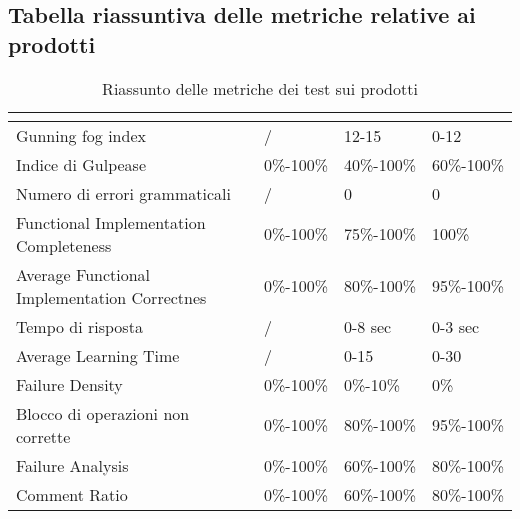 \subsection{Tabella riassuntiva delle metriche relative ai prodotti}
\renewcommand{\arraystretch}{1.5}
\begin{table}[H]
	\centering
	\begin{tabular}{|C{4cm}|C{3cm}|C{3cm}|C{3cm}|}
		\hline
		\textbf{\color{title_text}{Nome Metrica}} & \textbf{\color{title_text}{Intervallo limite}} & \textbf{\color{title_text}{Range accettabile}} & \textbf{\color{title_text}{Range ottimale}} \\ \hline
		Gunning fog index & / &12-15&0-12 \\ \hline
		Indice di Gulpease & 0\%-100\%& 40\%-100\%& 60\%-100\% \\ \hline
		Numero di errori grammaticali & / & 0 & 0 \\ \hline
		Functional Implementation Completeness & 0\%-100\% & 75\%-100\% & 100\% \\ \hline
		Average Functional Implementation Correctnes&0\%-100\%&80\%-100\%&95\%-100\% \\ \hline
		Tempo di risposta & / &0-8 sec & 0-3 sec \\ \hline
		Average Learning Time& / &0-15 & 0-30 \\ \hline
		Failure Density&0\%-100\%&0\%-10\%&0\% \\ \hline
		Blocco di operazioni non corrette &0\%-100\%&80\%-100\%&95\%-100\% \\ \hline
		Failure Analysis&0\%-100\%&60\%-100\%&80\%-100\% \\ \hline
		Comment Ratio&0\%-100\%&60\%-100\%&80\%-100\%\\ \hline
	\end{tabular}
	\caption{Riassunto delle metriche dei test sui prodotti}
	\label{tabella:riassunto metriche dei test sui prodotti}
\end{table}
\renewcommand{\arraystretch}{1}
\pagebreak